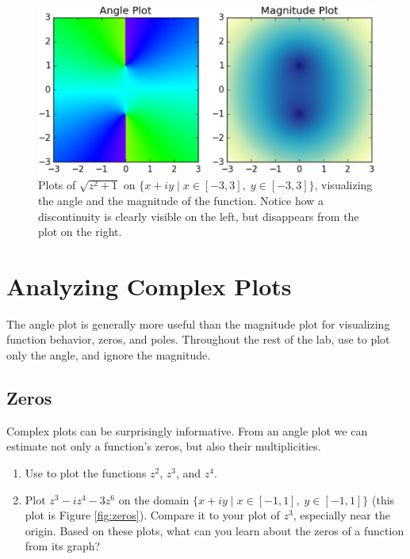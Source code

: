 \begin{figure}[H]
\includegraphics[width=\textwidth]{figures/check_plot_magnitude.pdf}
\caption{Plots of $\sqrt{z^2+1}$ on $\{x+iy \mid x \in [-3,3] , \; y \in [-3,3]\}$, visualizing the angle and the magnitude of the function.
Notice how a discontinuity is clearly visible on the left, but disappears from the plot on the right.}
\label{fig:check_plot_2}
\end{figure}


\section*{Analyzing Complex Plots}

The angle plot is generally more useful than the magnitude plot for visualizing function behavior, zeros, and poles.
Throughout the rest of the lab, use  to plot only the angle, and ignore the magnitude.

\subsection*{Zeros}

Complex plots can be surprisingly informative.
From an angle plot we can estimate not only a function's zeros, but also their multiplicities.

\begin{problem}\label{prob:zeros}
\leavevmode
\begin{enumerate}
\item Use  to plot the functions $z^2$, $z^3$, and $z^4$.
\item Plot $z^3 - iz^4 - 3z^6$ on the domain $\{x+iy \mid x \in [-1,1] , \; y \in [-1,1]\}$ (this plot is Figure \ref{fig:zeros}).
Compare it to your plot of $z^3$, especially near the origin.
Based on these plots, what can you learn about the zeros of a function from its graph?
\end{enumerate}
\end{problem}

